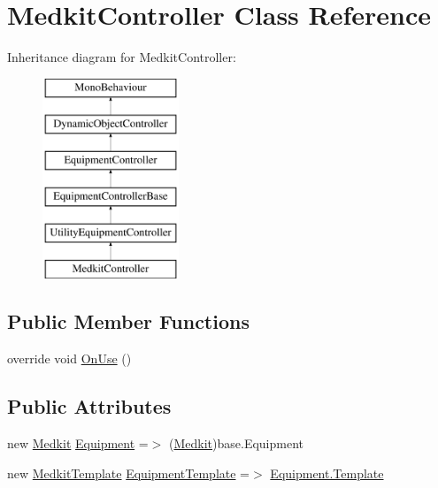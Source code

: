 \hypertarget{class_medkit_controller}{}\section{Medkit\+Controller Class Reference}
\label{class_medkit_controller}
Inheritance diagram for Medkit\+Controller\+:\begin{figure}[H]
\begin{center}
\leavevmode
\includegraphics[height=6.000000cm]{class_medkit_controller}
\end{center}
\end{figure}
\subsection*{Public Member Functions}
\begin{DoxyCompactItemize}
\item 
override void \mbox{\hyperlink{class_medkit_controller_a2958e0af81978b3a5c616ecdbeb520d3}{On\+Use}} ()
\end{DoxyCompactItemize}
\subsection*{Public Attributes}
\begin{DoxyCompactItemize}
\item 
new \mbox{\hyperlink{class_medkit}{Medkit}} \mbox{\hyperlink{class_medkit_controller_a2e945c06edfe2c7c810478dda73d889c}{Equipment}} =$>$ (\mbox{\hyperlink{class_medkit}{Medkit}})base.\+Equipment
\item 
new \mbox{\hyperlink{class_medkit_template}{Medkit\+Template}} \mbox{\hyperlink{class_medkit_controller_a0d17d417f86a2e59593aa7130c3c3d0a}{Equipment\+Template}} =$>$ \mbox{\hyperlink{class_equipment_a691c8de53afa564d0b1a0f1adb0978b7}{Equipment.\+Template}}
\end{DoxyCompactItemize}
